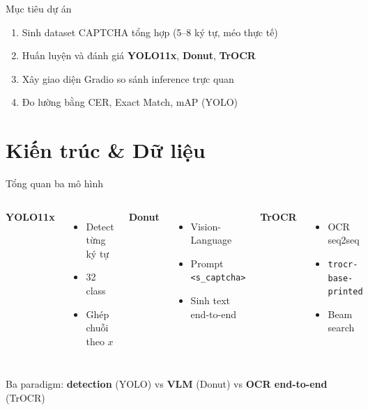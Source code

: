 \documentclass[aspectratio=169,12pt]{beamer}
\begin{document}
\begin{frame}{Mục tiêu dự án}
  \begin{enumerate}
    \item Sinh dataset CAPTCHA tổng hợp (5--8 ký tự, méo thực tế)
    \item Huấn luyện và đánh giá \textbf{YOLO11x}, \textbf{Donut}, \textbf{TrOCR}
    \item Xây giao diện Gradio so sánh inference trực quan
    \item Đo lường bằng CER, Exact Match, mAP (YOLO)
  \end{enumerate}
\end{frame}

\section{Kiến trúc \& Dữ liệu}

\begin{frame}{Tổng quan ba mô hình}
  \begin{columns}[T]
    \textbf{YOLO11x}
    \begin{itemize}
      \item Detect từng ký tự
      \item 32 class
      \item Ghép chuỗi theo $x$
    \end{itemize}

    \textbf{Donut}
    \begin{itemize}
      \item Vision-Language
      \item Prompt \texttt{<s\_captcha>}
      \item Sinh text end-to-end
    \end{itemize}

    \textbf{TrOCR}
    \begin{itemize}
      \item OCR seq2seq
      \item \texttt{trocr-base-printed}
      \item Beam search
    \end{itemize}
  \end{columns}

  \vspace{0.5cm}
  \small
  Ba paradigm: \textbf{detection} (YOLO) vs \textbf{VLM} (Donut) vs \textbf{OCR end-to-end} (TrOCR)
\end{frame}
\end{document}
